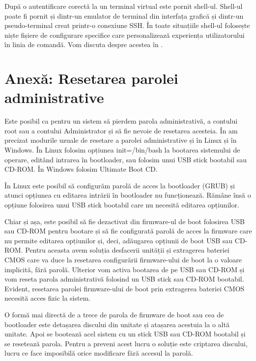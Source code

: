După o autentificare corectă la un terminal virtual este pornit shell-ul.
Shell-ul poate fi pornit și dintr-un emulator de terminal din interfața grafică
și dintr-un pseudo-terminal creat printr-o conexiune SSH. În toate situațiile
shell-ul folosește niște fișiere de configurare specifice care personalizează
experiența utilizatorului în linia de comandă. Vom discuta despre acestea în
.

\section{Anexă: Resetarea parolei administrative}
\label{sec:boot-passreset}

Este posibil ca pentru un sistem să pierdem parola administrativă, a contului
root sau a contului Administrator și să fie nevoie de resetarea acesteia. În
 am precizat modurile
uzuale de resetare a parolei administrative și în Linux și în Windows. În Linux
folosim opțiunea init=/bin/bash la bootarea sistemului de operare, editând
intrarea în bootloader, sau folosim unui USB stick bootabil sau CD-ROM. În
Windows folosim Ultimate Boot CD.

În Linux este posibil să configurăm parolă de acces la bootloader (GRUB) și
atunci opțiunea cu editarea intrării în bootloader nu funcționează. Rămâne însă
o opțiune folosirea unui USB stick bootabil care nu necesită editarea
opțiunilor.

Chiar și așa, este posibil să fie dezactivat din firmware-ul de boot folosirea
USB sau CD-ROM pentru bootare și să fie configurată parolă de acces la firmware
care nu permite editarea opțiunilor și, deci, adăugarea opțiunii de boot USB sau
CD-ROM. Pentru aceasta avem soluția desfacerii unității și extragerea bateriei
CMOS care va duce la resetarea configurării firmware-ului de boot la o valoare
implicită, fără parolă. Ulterior vom activa bootarea de pe USB sau CD-ROM și vom
reseta parola administrativă folosind un USB stick sau CD-ROM bootabil. Evident,
resetarea parolei firmware-ului de boot prin extragerea bateriei CMOS necesită
acces fizic la sistem.

O formă mai directă de a trece de parola de firmware de boot sau cea de
bootloader este detașarea discului din unitate și atașarea acestuia la o altă
unitate. Apoi se bootează acel sistem cu un stick USB sau CD-ROM bootabil și se
resetează parola. Pentru a preveni acest lucru o soluție este criptarea
discului, lucru ce face imposibilă orice modificare fără accesul la parolă.


